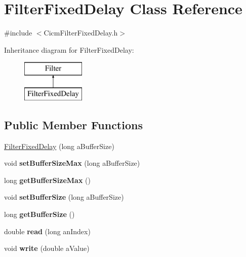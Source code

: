 \hypertarget{class_filter_fixed_delay}{\section{Filter\-Fixed\-Delay Class Reference}
\label{class_filter_fixed_delay}
}


{\ttfamily \#include $<$Cicm\-Filter\-Fixed\-Delay.\-h$>$}

Inheritance diagram for Filter\-Fixed\-Delay\-:\begin{figure}[H]
\begin{center}
\leavevmode
\includegraphics[height=2.000000cm]{class_filter_fixed_delay}
\end{center}
\end{figure}
\subsection*{Public Member Functions}
\begin{DoxyCompactItemize}
\item 
\hyperlink{class_filter_fixed_delay_acb3475c949445f1179cb5b17055e5312}{Filter\-Fixed\-Delay} (long a\-Buffer\-Size)
\item 
\hypertarget{class_filter_fixed_delay_aa1e8a10653689a512916094f378cb661}{void {\bfseries set\-Buffer\-Size\-Max} (long a\-Buffer\-Size)}\label{class_filter_fixed_delay_aa1e8a10653689a512916094f378cb661}

\item 
\hypertarget{class_filter_fixed_delay_a69f4c712bece5f7a6b15b5a4715a2167}{long {\bfseries get\-Buffer\-Size\-Max} ()}\label{class_filter_fixed_delay_a69f4c712bece5f7a6b15b5a4715a2167}

\item 
\hypertarget{class_filter_fixed_delay_a14558b513c2f9dac8f0dbb7cd6264e31}{void {\bfseries set\-Buffer\-Size} (long a\-Buffer\-Size)}\label{class_filter_fixed_delay_a14558b513c2f9dac8f0dbb7cd6264e31}

\item 
\hypertarget{class_filter_fixed_delay_ac91f32a7010d7118b6c2513aa090a56c}{long {\bfseries get\-Buffer\-Size} ()}\label{class_filter_fixed_delay_ac91f32a7010d7118b6c2513aa090a56c}

\item 
\hypertarget{class_filter_fixed_delay_a7632b4def4ca6e21d01e5c11142225e7}{double {\bfseries read} (long an\-Index)}\label{class_filter_fixed_delay_a7632b4def4ca6e21d01e5c11142225e7}

\item 
\hypertarget{class_filter_fixed_delay_ad4a8e14f9e0f8752876cf661345b9ff4}{void {\bfseries write} (double a\-Value)}\label{class_filter_fixed_delay_ad4a8e14f9e0f8752876cf661345b9ff4}

\end{DoxyCompactItemize}
